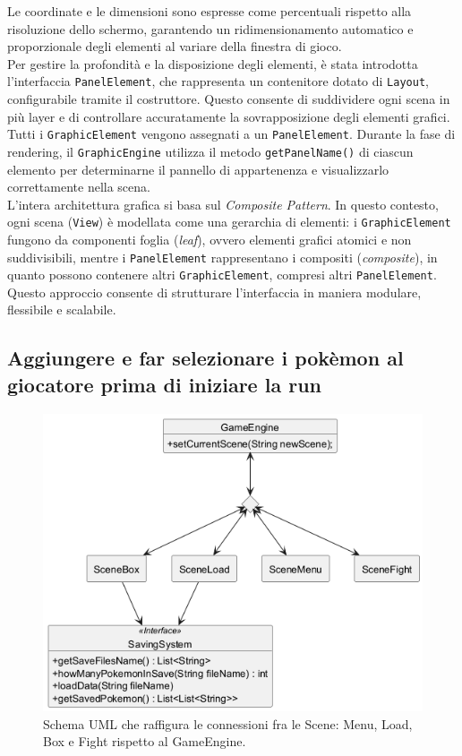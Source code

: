 \documentclass[a4paper,12pt]{report}
\begin{document}
{{Le coordinate e le dimensioni sono espresse come percentuali rispetto alla risoluzione dello schermo, garantendo un ridimensionamento automatico e proporzionale degli elementi al variare della finestra di gioco.\\
Per gestire la profondità e la disposizione degli elementi, è stata introdotta l'interfaccia \texttt{PanelElement}, che rappresenta un contenitore dotato di \texttt{Layout}, configurabile tramite il costruttore. Questo consente di suddividere ogni scena in più layer e di controllare accuratamente la sovrapposizione degli elementi grafici.\\
Tutti i \texttt{GraphicElement} vengono assegnati a un \texttt{PanelElement}. Durante la fase di rendering, il \texttt{GraphicEngine} utilizza il metodo \texttt{getPanelName()} di ciascun elemento per determinarne il pannello di appartenenza e visualizzarlo correttamente nella scena.\\
L’intera architettura grafica si basa sul \textit{Composite Pattern}. In questo contesto, ogni scena (\texttt{View}) è modellata come una gerarchia di elementi: i \texttt{GraphicElement} fungono da componenti foglia (\textit{leaf}), ovvero elementi grafici atomici e non suddivisibili, mentre i \texttt{PanelElement} rappresentano i compositi (\textit{composite}), in quanto possono contenere altri \texttt{GraphicElement}, compresi altri \texttt{PanelElement}. Questo approccio consente di strutturare l’interfaccia in maniera modulare, flessibile e scalabile.\\



\subsection*{Aggiungere e far selezionare i pokèmon al giocatore prima di iniziare la run}


\begin{figure}[H]
\centering{}
\includegraphics[width=\textwidth]{immagini/MenuLoadBoxuml.png}
\caption{Schema UML che raffigura le connessioni fra le Scene: Menu, Load, Box e Fight rispetto al GameEngine. }
\label{immagini/MenuLoadBoxuml.png}
\end{figure}

}}
\end{document}
